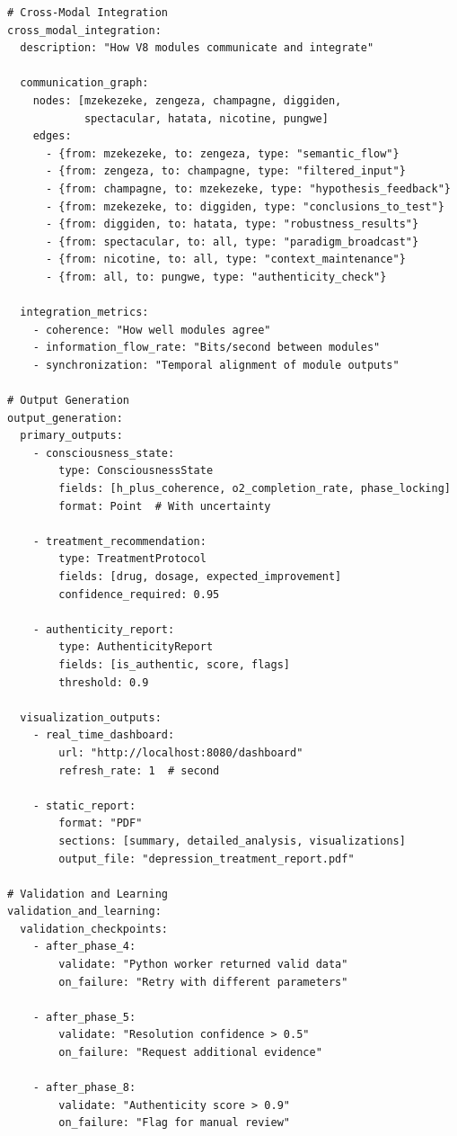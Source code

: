 \begin{verbatim}
# Cross-Modal Integration
cross_modal_integration:
  description: "How V8 modules communicate and integrate"
  
  communication_graph:
    nodes: [mzekezeke, zengeza, champagne, diggiden, 
            spectacular, hatata, nicotine, pungwe]
    edges:
      - {from: mzekezeke, to: zengeza, type: "semantic_flow"}
      - {from: zengeza, to: champagne, type: "filtered_input"}
      - {from: champagne, to: mzekezeke, type: "hypothesis_feedback"}
      - {from: mzekezeke, to: diggiden, type: "conclusions_to_test"}
      - {from: diggiden, to: hatata, type: "robustness_results"}
      - {from: spectacular, to: all, type: "paradigm_broadcast"}
      - {from: nicotine, to: all, type: "context_maintenance"}
      - {from: all, to: pungwe, type: "authenticity_check"}
  
  integration_metrics:
    - coherence: "How well modules agree"
    - information_flow_rate: "Bits/second between modules"
    - synchronization: "Temporal alignment of module outputs"

# Output Generation
output_generation:
  primary_outputs:
    - consciousness_state:
        type: ConsciousnessState
        fields: [h_plus_coherence, o2_completion_rate, phase_locking]
        format: Point  # With uncertainty
    
    - treatment_recommendation:
        type: TreatmentProtocol
        fields: [drug, dosage, expected_improvement]
        confidence_required: 0.95
    
    - authenticity_report:
        type: AuthenticityReport
        fields: [is_authentic, score, flags]
        threshold: 0.9
  
  visualization_outputs:
    - real_time_dashboard:
        url: "http://localhost:8080/dashboard"
        refresh_rate: 1  # second
    
    - static_report:
        format: "PDF"
        sections: [summary, detailed_analysis, visualizations]
        output_file: "depression_treatment_report.pdf"

# Validation and Learning
validation_and_learning:
  validation_checkpoints:
    - after_phase_4:
        validate: "Python worker returned valid data"
        on_failure: "Retry with different parameters"
    
    - after_phase_5:
        validate: "Resolution confidence > 0.5"
        on_failure: "Request additional evidence"
    
    - after_phase_8:
        validate: "Authenticity score > 0.9"
        on_failure: "Flag for manual review"
  

\end{verbatim}
